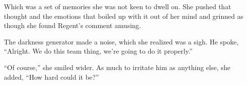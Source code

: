 Which was a set of memories she was not keen to dwell on.  She pushed that thought and the emotions that boiled up with it out of her mind and grinned as though she found Regent's comment amusing.



The darkness generator made a noise, which she realized was a sigh.  He spoke, ``Alright.  We do this team thing, we're going to do it properly.''



``Of course,'' she smiled wider.  As much to irritate him as anything else, she added, ``How hard could it be?''





